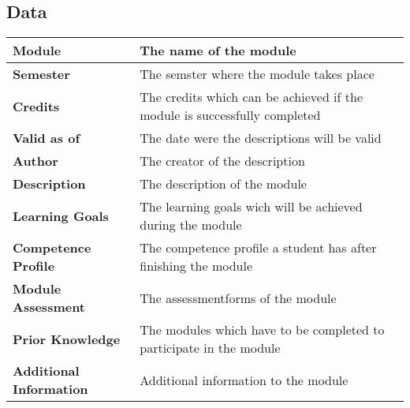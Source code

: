     \subsection{Data}
    \begin{table}[H]
        \begin{tabular}{p{} | p{}}
            \textbf{Module} & The name of the module \\ \hline \hline
            \textbf{Semester} & The semster where the module takes place \\ \hline 
            \textbf{Credits} & The credits which can be achieved \newline if the module is successfully completed \\ \hline
            \textbf{Valid as of} & The date were the descriptions will be valid \\ \hline
            \textbf{Author} & The creator of the description \\ \hline
            \textbf{Description} & The description of the module \\ \hline
            \textbf{Learning Goals} & The learning goals wich will be achieved during the module \\ \hline
            \textbf{Competence Profile} & The competence profile a student has after finishing the module \\ \hline
            \textbf{Module Assessment} & The assessmentforms of the module \\ \hline
            \textbf{Prior Knowledge} & The modules which have to be \newline completed to participate in the module \\ \hline
            \textbf{Additional Information} & Additional information to the module
        \end{tabular}
    \end{table}
    \pagebreak
